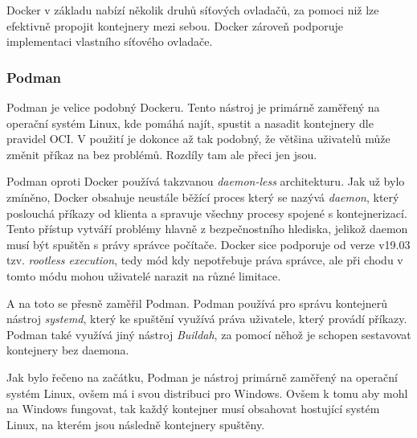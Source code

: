 Docker v základu nabízí několik druhů síťových ovladačů, za pomoci niž lze efektivně propojit kontejnery mezi sebou. Docker zároveň podporuje implementaci vlastního síťového ovladače. \cite{docker_networking_overview}


\subsubsection{Podman}
Podman je velice podobný Dockeru. Tento nástroj je primárně zaměřený na operační systém Linux, kde pomáhá najít, spustit a nasadit kontejnery dle pravidel OCI. V použití je dokonce až tak podobný, že většina uživatelů může změnit příkaz  na  bez problémů. Rozdíly tam ale přeci jen jsou. 

Podman oproti Docker používá takzvanou \textit{daemon-less} architekturu. Jak už bylo zmíněno, Docker obsahuje neustále běžící proces který se nazývá \textit{daemon}, který poslouchá příkazy od klienta a spravuje všechny procesy spojené s kontejnerizací. Tento přístup vytváří problémy hlavně z bezpečnostního hlediska, jelikož daemon musí být spuštěn s právy správce počítače. Docker sice podporuje od verze v19.03 tzv. \textit{rootless execution}, tedy mód kdy nepotřebuje práva správce, ale při chodu v tomto módu mohou uživatelé narazit na různé limitace.

A na toto se přesně zaměřil Podman. Podman používá pro správu kontejnerů nástroj \textit{systemd}, který ke spuštění využívá práva uživatele, který provádí příkazy. Podman také využívá jiný nástroj \textit{Buildah}, za pomocí něhož je schopen sestavovat kontejnery bez daemona. 

Jak bylo řečeno na začátku, Podman je nástroj primárně zaměřený na operační systém Linux, ovšem má i svou distribuci pro Windows. Ovšem k tomu aby mohl na Windows fungovat, tak každý kontejner musí obsahovat hostující systém Linux, na kterém jsou následně kontejnery spuštěny. \cite{podman}\cite{podman_vs_docker}